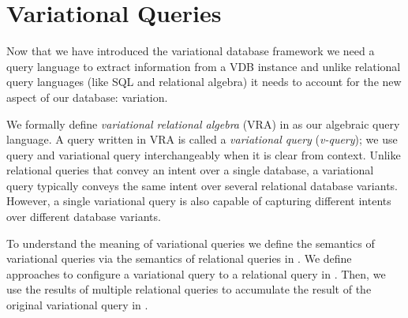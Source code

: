 \chapter{Variational Queries}
\label{ch:vql}


Now that we have introduced the variational database framework 
we need a query language to extract information from a VDB instance
and unlike relational query languages (like SQL and relational algebra)
it needs to account for the new aspect of our database: variation. 


We formally define 
\emph{variational relational algebra} (VRA) in 
as our algebraic query language.
A query written in VRA is called a \emph{variational query} (\emph{v-query});
we use query and variational query interchangeably when it is clear from context. 
Unlike relational queries that convey an intent over a single database, 
a variational query typically conveys the same intent over several 
relational database variants. However, a single variational query is also capable of capturing different 
intents over different database variants.

To understand the meaning of variational queries
we define the semantics of variational queries via the
semantics of relational queries in . We define
approaches to configure a variational query to a relational query
in . Then, we use the results of multiple relational
queries to accumulate the result of the original variational query 
in .

